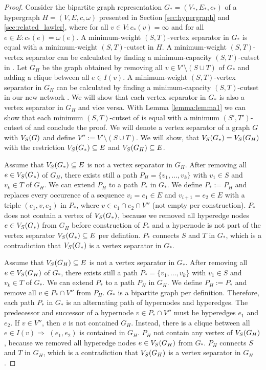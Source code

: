 \begin{proof}

Consider the bipartite graph representation $G_* = (V_*,E_*,c_*)$ 
of a hypergraph $H = (V,E,c,\omega)$ presented in Section \ref{sec:hypergraph} and \ref{sec:related_lawler}, 
where for all $v \in V: c_*(v) = \infty$ and for all $e \in E: c_*(e) = 
\omega(e)$. A minimum-weight $(S,T)$-vertex separator in $G_*$ is equal
with a minimum-weight $(S,T)$-cutset in $H$. A minimum-weight $(S,T)$-vertex separator can be calculated
by finding a minimum-capacity $(S,T)$-cutset in . Let $G_H$ be the graph obtained by removing
all $v \in V'\setminus (S \cup T)$ of $G_*$ and adding a clique between all $e \in I(v)$. 
A minimum-weight $(S,T)$-vertex separator in $G_H$ can be calculated by finding a 
minimum-capacity $(S,T)$-cutset in our new network .
We will show that each vertex separator in $G_*$ is also a vertex separator in $G_H$ and
vice versa. With Lemma \ref{lemma:lemma1} we can show that each minimum $(S,T)$-cutset
of  is equal with a minimum $(S',T')$-cutset of
 and conclude the proof. We will denote a vertex separator of a graph $G$ with 
$V_S(G)$ and define $V'' := V' \setminus (S \cup T)$. 
We will show, that $V_S(G_*) = V_S(G_H)$ with the restriction $V_S(G_*) \subseteq E$ and
$V_S(G_H) \subseteq E$.

Assume that $V_S(G_*) \subseteq E$ is not a vertex separator in $G_H$. After removing all $e \in V_S(G_*)$ of
$G_H$, there exists still a path $P_H = \{v_1, \ldots, v_k\}$ with $v_1 \in S$ and
$v_k \in T$ of $G_H$. We can extend $P_H$ to a path $P_*$ in $G_*$.
We define $P_* := P_H$ and replaces every occurence of a sequence $v_i = e_1 \in E$ and
$v_{i+1} = e_2 \in E$ with a triple $(e_1,v,e_2)$ in $P_*$, where $v \in e_1 \cap e_2 \cap V''$
(not empty per construction). $P_*$ does not contain a vertex of $V_S(G_*)$, because
we removed all hyperedge nodes $e \in V_S(G_*)$ from $G_H$ before construction of $P_*$ 
and a hypernode is not part of  the vertex separator $V_S(G_*) \subseteq E$ per defintion. 
$P_*$ connects $S$ and $T$ in $G_*$, which is a contradiction that $V_S(G_*)$ 
is a vertex separator in $G_*$.

Assume that $V_S(G_H) \subseteq E$ is not a vertex separator in $G_*$. After removing all $e \in V_S(G_H)$ of
$G_*$, there exists still a path $P_* = \{v_1, \ldots, v_k\}$ with $v_1 \in S$ and
$v_k \in T$ of $G_*$. We can extend $P_*$ to a path $P_H$ in $G_H$.
We define $P_H := P_*$ and remove all $v \in P_* \cap V''$ from $P_H$. $G_*$ is a bipartite
graph per definition. Therefore, each path $P_*$ in $G_*$ is an alternating path of hypernodes and
hyperedges. The predecessor and successor of a hypernode $v \in P_* \cap V''$ must be hyperedges
$e_1$ and $e_2$. If $v \in V''$, then $v$ is not contained $G_H$. Instead, there is
a clique between all $e \in I(v) \Rightarrow$ $(e_1,e_2)$ is contained in $G_H$.
$P_H$ not contain any vertex of $V_S(G_H)$, because we removed all hyperedge nodes $e \in V_S(G_H)$ 
from $G_*$. $P_H$ connects $S$ and $T$ in $G_H$, which is a contradiction that 
$V_S(G_H)$ is a vertex separator in $G_H$.


\end{proof}
